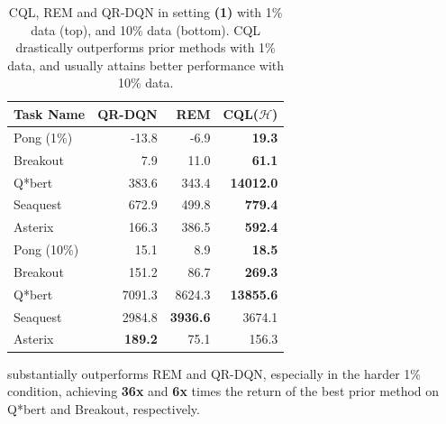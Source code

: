 \begin{table}
\captionsetup{font=small}
    \centering
    \vspace{-7pt}
    \fontsize{8}{8}\selectfont
    \begin{tabular}{l|r|r||r}
    \hline
        \textbf{Task Name} & \textbf{QR-DQN} & \textbf{REM} & \textbf{CQL($\mathcal{H}$)} \\
        \hline
         Pong (1\%) & -13.8 & -6.9 & \textbf{19.3} \\
         Breakout & 7.9 & 11.0 & \textbf{61.1} \\
         Q*bert & 383.6 & 343.4 & \textbf{14012.0} \\
         Seaquest & 672.9 & 499.8 & \textbf{779.4} \\
         Asterix  & 166.3 & 386.5 & \textbf{592.4}\\
         \hline
         \hline
         Pong (10\%) & 15.1 & 8.9 & \textbf{18.5} \\
         Breakout & 151.2 & 86.7 & \textbf{269.3} \\
         Q*bert & 7091.3 & 8624.3 & \textbf{13855.6}\\
         Seaquest & 2984.8 & \textbf{3936.6} & 3674.1 \\
         Asterix & \textbf{189.2} & 75.1 & 156.3 \\
         \hline
    \end{tabular}
    \vspace{-4pt}
    \caption{{CQL, REM and QR-DQN in setting \textbf{(1)} with 1\% data (top), and 10\% data (bottom). CQL drastically outperforms prior methods with 1\% data, and usually attains better performance with 10\% data.}}
    \normalsize
    \label{table:atari_reduced_size}
    \vspace{-17pt}
\end{table}
substantially outperforms REM and QR-DQN, especially in the harder 1\% condition, achieving \textbf{36x} and \textbf{6x} times the return of the best prior method on Q*bert and Breakout, respectively.

